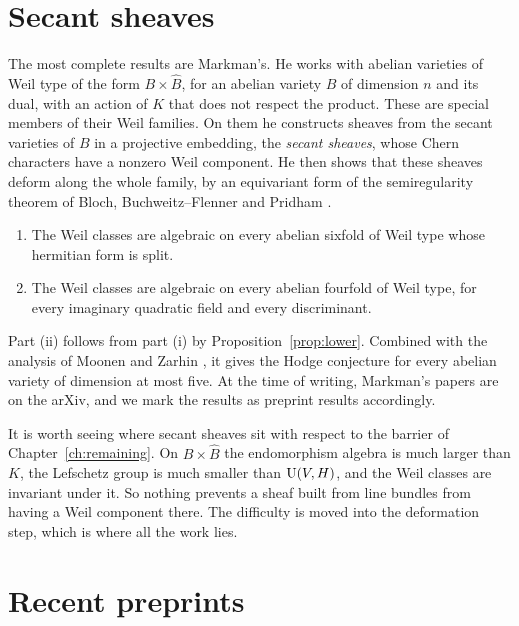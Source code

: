 \section{Secant sheaves}

The most complete results are Markman's. He works with abelian varieties of
Weil type of the form $B\times\widehat B$, for an abelian variety $B$ of
dimension $n$ and its dual, with an action of $K$ that does not respect the
product. These are special members of their Weil families. On them he
constructs sheaves from the secant varieties of $B$ in a projective
embedding, the \emph{secant sheaves}, whose Chern characters have a nonzero
Weil component. He then shows that these sheaves deform along the whole
family, by an equivariant form of the semiregularity theorem of Bloch,
Buchweitz--Flenner and Pridham \cite{Blo72,BF03,Pri24}.

\begin{theorem}\label{thm:markman}
\begin{enumerate}[label=(\roman*)]
\item The Weil classes are algebraic on every abelian sixfold of Weil type
whose hermitian form is split.
\item The Weil classes are algebraic on every abelian fourfold of Weil
type, for every imaginary quadratic field and every discriminant.
\end{enumerate}
\end{theorem}

Part (ii) follows from part (i) by Proposition~\ref{prop:lower}. Combined with
the analysis of Moonen and Zarhin \cite{MZ99}, it gives the Hodge
conjecture for every abelian variety of dimension at most five. At the time
of writing, Markman's papers are on the arXiv, and we mark the results as
preprint results accordingly.

It is worth seeing where secant sheaves sit with respect to the barrier of
Chapter~\ref{ch:remaining}. On $B\times\widehat B$ the endomorphism algebra is
much larger than $K$, the Lefschetz group is much smaller than $\operatorname{U}(V,H)$, and
the Weil classes are invariant under it. So nothing prevents a sheaf built
from line bundles from having a Weil component there. The difficulty is
moved into the deformation step, which is where all the work lies.

\section{Recent preprints}\label{sec:preprintsbook}

